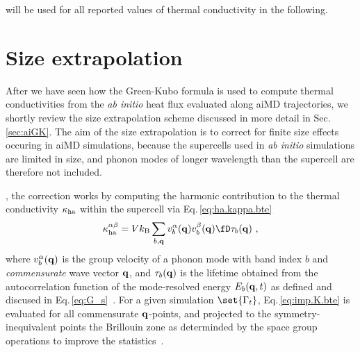  will be used for all reported values of thermal conductivity in the following.

\section{Size extrapolation}
\label{sec:imp.extrapolation}

After we have seen how the Green-Kubo formula is used to compute thermal conductivities from the \emph{ab initio} heat flux evaluated along aiMD trajectories, we shortly review the size extrapolation scheme discussed in more detail in Sec.\,\ref{sec:aiGK}. The aim of the size extrapolation is to correct for finite size effects occuring in aiMD simulations, because the supercells used in \emph{ab initio} simulations are limited in size, and phonon modes of longer wavelength than the supercell are therefore not included. 

, the correction works by computing the harmonic contribution to the thermal conductivity $\kappa_{\rm ha}$ within the supercell via Eq.\,\eqref{eq:ha.kappa.bte}
\begin{align}
	\kappa_{\rm ha}^{\alpha \beta} = V k_{\rm B} \sum_{b, {\bf q}} v^\alpha_b ({\bf q}) v^{\beta}_b ({\bf q}) \fD \tau_b ({\bf q})~,
	\label{eq:imp.K.bte}
\end{align}
where $v_b^\alpha ({\bf q})$ is the group velocity of a phonon mode with band index $b$ and \emph{commensurate} wave vector $\bf q$, and $\tau_b ({\bf q})$ is the lifetime obtained from the autocorrelation function of the mode-resolved energy $E_b ({\bf q}, t)$ as defined and discused in Eq.\,\eqref{eq:G_s}~\cite{Carbogno2016}. For a given simulation $\set{\Gamma_t}$, Eq.\,\eqref{eq:imp.K.bte} is evaluated for all commensurate $\bf q$-points, and projected to the symmetry-inequivalent points the Brillouin zone as determinded by the space group operations to improve the statistics~\cite{Maradudin1968,Spglib}.

